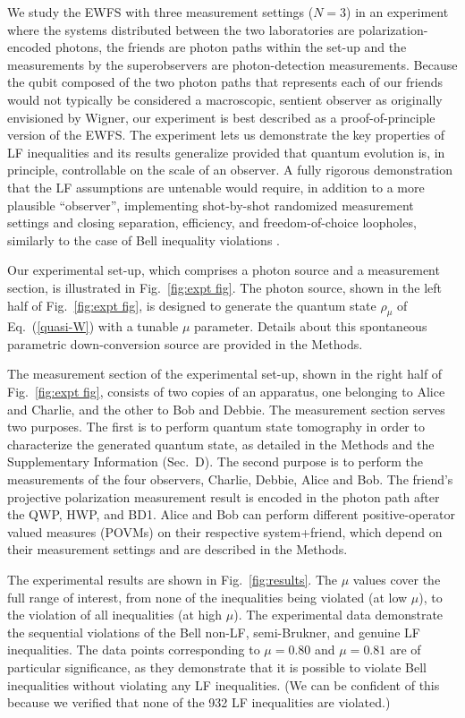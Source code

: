 \documentclass[aps,prx,twocolumn,superscriptaddress]{revtex4-1}
\theoremstyle{plain}
\begin{document}
We study the EWFS with three measurement settings ($N=3$) in an experiment where the systems distributed between the two laboratories are polarization-encoded photons, the friends are photon paths within the set-up and the measurements by the superobservers are photon-detection measurements. Because the qubit composed of the two photon paths that represents each of our friends would not typically be considered a macroscopic, sentient observer as originally envisioned by Wigner, our experiment is best described as a proof-of-principle version of the EWFS. The experiment lets us demonstrate the key properties of LF inequalities and its results generalize provided that quantum evolution is, in principle, controllable on the scale of an observer. A fully rigorous demonstration that the LF assumptions are untenable would require, in addition to a more plausible ``observer'', implementing shot-by-shot randomized measurement settings and closing separation, efficiency, and freedom-of-choice loopholes, similarly to the case of Bell inequality violations \cite{Giustina2015, Hensen2015, Shalm2015}.

Our experimental set-up, which comprises a photon source and a measurement section, is illustrated in Fig.~\ref{fig:expt fig}. The photon source, shown in the left half of Fig.~\ref{fig:expt fig}, is designed to generate the quantum state $\rho_{\mu}$ of Eq.~(\ref{quasi-W}) with a tunable $\mu$ parameter. Details about this spontaneous parametric down-conversion source are provided in the Methods.

The measurement section of the experimental set-up, shown in the right half of Fig.~\ref{fig:expt fig}, consists of two copies of an apparatus, one belonging to Alice and Charlie, and the other to Bob and Debbie. The measurement section serves two purposes. The first is to perform quantum state tomography in order to characterize the generated quantum state, as detailed in the Methods and the Supplementary Information (Sec.\ D). The second purpose is to perform the measurements of the four observers, Charlie, Debbie, Alice and Bob. The friend's projective polarization measurement result is encoded in the photon path after the QWP, HWP, and BD1. Alice and Bob can perform different positive-operator valued measures (POVMs) on their respective system+friend, which depend on their measurement settings and are described in the Methods.

The experimental results are shown in Fig.\ \ref{fig:results}. The $\mu$ values cover the full range of interest, from none of the inequalities being violated (at low $\mu$), to the violation of all inequalities (at high $\mu$). The experimental data demonstrate the sequential violations of the Bell non-LF, semi-Brukner, and genuine LF inequalities. The data points corresponding to $\mu=0.80$ and $\mu=0.81$ are of particular significance, as they demonstrate that it is possible to violate Bell inequalities without violating any LF inequalities. (We can be confident of this because we verified that none of the 932 LF inequalities are violated.)
\end{document}
